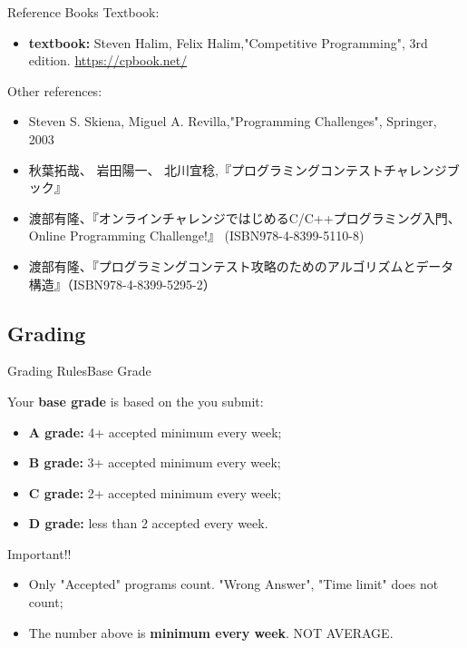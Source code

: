 \begin{frame}{Reference Books}
  Textbook:
  \begin{itemize}
    \item {\bf textbook:} Steven Halim, Felix Halim,"Competitive Programming", 3rd edition. \url{https://cpbook.net/}
  \end{itemize}
  \bigskip

  Other references:
  \begin{itemize}
    \item Steven S. Skiena, Miguel A. Revilla,"Programming Challenges", Springer, 2003
    \item 秋葉拓哉、 岩田陽一、 北川宜稔,『プログラミングコンテストチャレンジブック』
    \item 渡部有隆、『オンラインチャレンジではじめるC/C++プログラミング入門、Online Programming Challenge!』 (ISBN978-4-8399-5110-8)
    \item 渡部有隆、『プログラミングコンテスト攻略のためのアルゴリズムとデータ構造』（ISBN978-4-8399-5295-2）
  \end{itemize}
\end{frame}

\subsection{Grading}
\begin{frame}{Grading Rules}{Base Grade}

  Your {\bf base grade} is based on the  you submit:

  \begin{itemize}
    \item {\bf A grade:} 4+ accepted minimum every week;
    \item {\bf B grade:} 3+ accepted minimum every week;
    \item {\bf C grade:} 2+ accepted minimum every week;
    \item {\bf D grade:} less than 2 accepted every week.
  \end{itemize}\bigskip

  \begin{alertblock}{Important!!}
    \begin{itemize}
      \item Only "Accepted" programs count. "Wrong Answer", "Time limit" does not count;
      \item The number above is {\bf minimum every week}. NOT AVERAGE.
    \end{itemize}
  \end{alertblock}
\end{frame}

